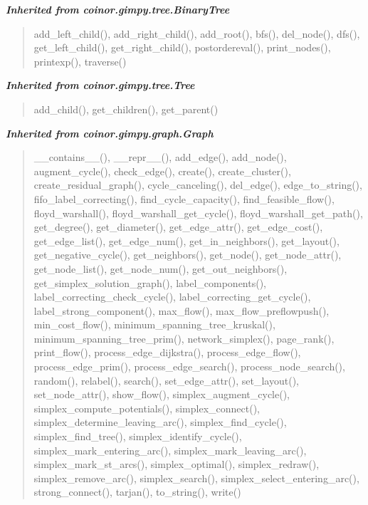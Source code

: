 \large{\textbf{\textit{Inherited from coinor.gimpy.tree.BinaryTree}}}

\begin{quote}
add\_left\_child(), add\_right\_child(), add\_root(), bfs(), del\_node(), dfs(), get\_left\_child(), get\_right\_child(), postordereval(), print\_nodes(), printexp(), traverse()
\end{quote}

\large{\textbf{\textit{Inherited from coinor.gimpy.tree.Tree}}}

\begin{quote}
add\_child(), get\_children(), get\_parent()
\end{quote}

\large{\textbf{\textit{Inherited from coinor.gimpy.graph.Graph}}}

\begin{quote}
\_\_contains\_\_(), \_\_repr\_\_(), add\_edge(), add\_node(), augment\_cycle(), check\_edge(), create(), create\_cluster(), create\_residual\_graph(), cycle\_canceling(), del\_edge(), edge\_to\_string(), fifo\_label\_correcting(), find\_cycle\_capacity(), find\_feasible\_flow(), floyd\_warshall(), floyd\_warshall\_get\_cycle(), floyd\_warshall\_get\_path(), get\_degree(), get\_diameter(), get\_edge\_attr(), get\_edge\_cost(), get\_edge\_list(), get\_edge\_num(), get\_in\_neighbors(), get\_layout(), get\_negative\_cycle(), get\_neighbors(), get\_node(), get\_node\_attr(), get\_node\_list(), get\_node\_num(), get\_out\_neighbors(), get\_simplex\_solution\_graph(), label\_components(), label\_correcting\_check\_cycle(), label\_correcting\_get\_cycle(), label\_strong\_component(), max\_flow(), max\_flow\_preflowpush(), min\_cost\_flow(), minimum\_spanning\_tree\_kruskal(), minimum\_spanning\_tree\_prim(), network\_simplex(), page\_rank(), print\_flow(), process\_edge\_dijkstra(), process\_edge\_flow(), process\_edge\_prim(), process\_edge\_search(), process\_node\_search(), random(), relabel(), search(), set\_edge\_attr(), set\_layout(), set\_node\_attr(), show\_flow(), simplex\_augment\_cycle(), simplex\_compute\_potentials(), simplex\_connect(), simplex\_determine\_leaving\_arc(), simplex\_find\_cycle(), simplex\_find\_tree(), simplex\_identify\_cycle(), simplex\_mark\_entering\_arc(), simplex\_mark\_leaving\_arc(), simplex\_mark\_st\_arcs(), simplex\_optimal(), simplex\_redraw(), simplex\_remove\_arc(), simplex\_search(), simplex\_select\_entering\_arc(), strong\_connect(), tarjan(), to\_string(), write()
\end{quote}

